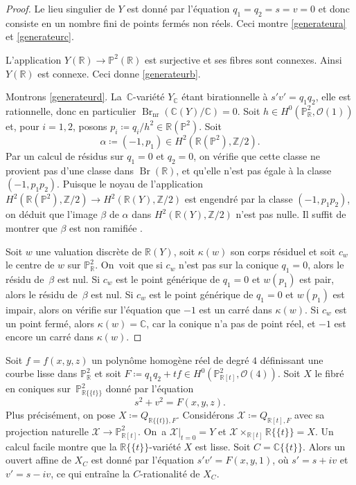 \documentclass[JEP,XML,SOM,Unicode,francais,published]{cedram}
\theoremstyle{definition}
\newcommand{\C}{\mathbb C}
\newcommand{\Z}{\mathbb Z}
\newcommand{\R}{\mathbb R}
\renewcommand{\P}{\mathbb P}
\newcommand{\Br}{\operatorname{Br}}
\newcommand{\mc}[1]{\mathcal{#1}}
\newcommand{\puiseux}{\mathbb{R}\{\!\{t\}\!\}}
\begin{document}
\begin{proof}
Le lieu singulier de $Y$ est donné par l'équation $q_{1}=q_{2}=s=v=0$ et donc consiste en un nombre fini de points fermés non réels. Ceci montre \eqref{generateura} et \eqref{generateurc}.

L'application $Y(\R) \to \P^2(\R)$ est surjective et ses fibres
sont connexes. Ainsi $Y(\R)$ est connexe. Ceci donne \eqref{generateurb}.

Montrons \eqref{generateurd}. La~$\C$-variété $Y_\C$ étant birationnelle à $s'v'= q_1q_2$, elle est rationnelle, donc en particulier $\Br_{\mathrm{nr}}(\C(Y)/\C)=0$. Soit $h\in H^0(\P^2_\R,\mc{O}(1))$ et, pour $i=1,2$, posons $p_i\coloneqq q_i/h^2\in \R(\P^2)$. Soit \[\alpha\coloneqq (-1,p_1)\in H^2(\R(\P^2), \Z/2).\] Par un calcul de résidus sur $q_1=0$ et $q_2=0$, on vérifie que cette classe ne provient pas d'une classe dans $\Br(\R)$, et qu'elle n'est pas égale à la classe $(-1, p_1p_2)$.
Puisque le noyau de l'application $H^2(\R(\P^2), \Z/2)\to H^2(\R(Y), \Z/2)$ est engendré par la classe $(-1, p_1p_2)$, on déduit que l'image $\beta$ de $\alpha$ dans $H^2(\R(Y), \Z/2)$ n'est pas nulle. Il suffit de montrer que $\beta$ est non ramifiée \cite[Prop.\,4.2.3(a)]{colliot1995birational}.

Soit $w$ une valuation discrète de $\R(Y)$, soit $\kappa(w)$ son corps résiduel et soit $c_w$ le centre de $w$ sur $\P^2_\R$. On~voit que si $c_w$
n'est pas sur la conique $q_1=0$, alors le résidu de~$\beta$ est nul. Si $c_w$ est le point générique de $q_1=0$ et $w(p_{1})$ est pair, alors le résidu de~$\beta$ est nul.
Si $c_w$ est le point générique de $q_1=0$ et $w(p_{1})$ est impair, alors on vérifie sur l'équation que $-1$ est un carré dans $\kappa(w)$. Si $c_w$ est un point fermé, alors $\kappa(w)=\C$, car la conique n'a pas de point réel, et $-1$ est encore un carré dans $\kappa(w)$.
\end{proof}

Soit $f=f(x,y,z)$ un polynôme homogène réel de degré $4$ définissant une courbe lisse dans $\P^2_\R$ et soit $F\coloneqq q_1q_2+tf\in H^0(\P^2_{\R[t]},\mc{O}(4))$. Soit $X$ le fibré en coniques sur~$\P^2_{\puiseux}$ donné par l'équation
\[s^2+v^2=F(x,y,z).\]
Plus précisément, on pose $X\coloneqq Q_{\puiseux,F}$. Considérons $\mc{X}\coloneqq Q_{\R[t],F}$ avec sa projection naturelle $\mc{X}\to \P^2_{\R[t]}$. On~a $\mc{X}|_{t=0}=Y$ et $\mc{X}\times_{\R[t]}\puiseux=X$. Un calcul facile montre que la $\puiseux$-variété $X$ est lisse. Soit $C=\C\{\!\{t\}\!\}$. Alors un ouvert affine de $X_C$ est donné par l'équation $s'v'=F(x,y,1)$, où $s'=s+iv$ et $v'=s-iv$, ce qui entraîne la $C$-rationalité de $X_C$.
\end{document}
